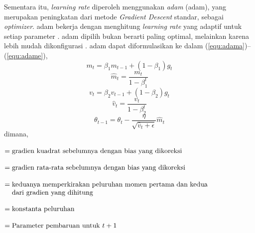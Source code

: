 Sementara itu, \textit{learning rate} diperoleh menggunakan \textit{\acrlong{adam}} (\acrshort{adam}), yang merupakan peningkatan dari metode \textit{Gradient Descent} standar, sebagai \textit{optimizer}. \acrshort{adam} bekerja dengan menghitung \textit{learning rate} yang adaptif untuk setiap parameter . \acrshort{adam} dipilih bukan berarti paling optimal, melainkan karena lebih mudah dikonfigurasi . \acrshort{adam} dapat diformulasikan ke dalam (\ref{equ:adama})--(\ref{equ:adame}),
\begin{equation}
    m_t = \beta_1m_{t-1}+(1-\beta_1)g_t
    \label{equ:adama}
\end{equation}
\begin{equation}
    \hat m_t = \frac{m_t}{1-\beta^t_1}
    \label{equ:adamb}
\end{equation}
\begin{equation}
    v_t = \beta_2v_{t-1}+(1-\beta_2)g_t
    \label{equ:adamc}
\end{equation}
\begin{equation}
    \hat v_t = \frac{v_t}{1-\beta^t_2}
    \label{equ:adamd}
\end{equation}
\begin{equation}
    \theta_{t-1} = \theta_t-\frac{\eta}{\sqrt{\hat v_t + \epsilon}} \hat m_t
    \label{equ:adame}
\end{equation}
dimana,
\begin{description}[align=parleft,labelwidth=1.5cm]
    \item[$\hat v_t$] $= \parbox[t]{9.9cm}{gradien kuadrat sebelumnya dengan bias yang dikoreksi}$
    \item[$\hat m_t$] $= \parbox[t]{9.9cm}{gradien rata-rata sebelumnya dengan bias yang dikoreksi}$
    \item[$v_t, m_t$] $= \parbox[t]{9.9cm}{keduanya memperkirakan peluruhan momen pertama dan kedua dari gradien yang dihitung}$
    \item[$\beta$] $= \parbox[t]{9.9cm}{konstanta peluruhan}$
    \item[$\theta_{t+1}$] $= \parbox[t]{9.9cm}{Parameter pembaruan untuk $t+1$}$
\end{description}

